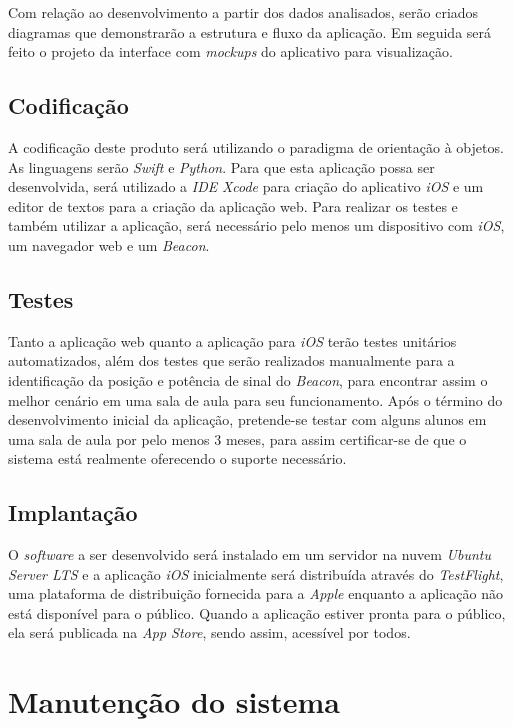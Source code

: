 \documentclass[
	12pt,
	oneside,
	a4paper,
	english,
	brazil,
]{abntex2}
\begin{document}
Com relação ao desenvolvimento a partir dos dados analisados, serão criados diagramas que demonstrarão a estrutura e fluxo da aplicação. Em seguida será feito o projeto da interface com \emph{mockups} do aplicativo para visualização.

\subsection{Codificação}

A codificação deste produto será utilizando o paradigma de orientação à objetos. As linguagens serão \emph{Swift} e \emph{Python}. Para que esta aplicação possa ser desenvolvida, será utilizado a \emph{IDE} \emph{Xcode} para criação do aplicativo \emph{iOS} e um editor de textos para a criação da aplicação web. Para realizar os testes e também utilizar a aplicação, será necessário pelo menos um dispositivo com \emph{iOS}, um navegador web e um \emph{Beacon}.

\subsection{Testes}

Tanto a aplicação web quanto a aplicação para \emph{iOS} terão testes unitários automatizados, além dos testes que serão realizados manualmente para a identificação da posição e potência de sinal do \emph{Beacon}, para encontrar assim o melhor cenário em uma sala de aula para seu funcionamento. Após o término do desenvolvimento inicial da aplicação, pretende-se testar com alguns alunos em uma sala de aula por pelo menos 3 meses, para assim certificar-se de que o sistema está realmente oferecendo o suporte necessário.

\subsection{Implantação}

O \emph{software} a ser desenvolvido será instalado em um servidor na nuvem \emph{Ubuntu Server LTS} e a aplicação \emph{iOS} inicialmente será distribuída através do \emph{TestFlight}, uma plataforma de distribuição fornecida para a \emph{Apple} enquanto a aplicação não está disponível para o público. Quando a aplicação estiver pronta para o público, ela será publicada na \emph{App Store}, sendo assim, acessível por todos.

\section{Manutenção do sistema}
\end{document}
